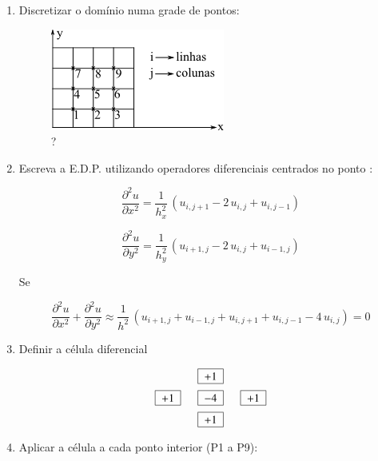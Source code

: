 \begin{enumerate}
 \item Discretizar o domínio numa grade de pontos:

\begin{figure}[htb]
 \centering
 \includegraphics[scale=1.0]{capitulos/capitulo3/figuras/aprox_der_par_dif_fin2.png}
 \caption{?}
 \label{fig:aprox_der_par_dif_fin2}
\end{figure}

\item Escreva a E.D.P. utilizando operadores diferenciais centrados no ponto :

\begin{equation}
 \label{cap3:sec4:eq1}
 \frac{\partial^2 u}{\partial x^2} = \frac{1}{h_x^2} \, (u_{i,j+1} - 2\,u_{i,j} + u_{i,j-1})
\end{equation}

\begin{equation}
 \label{cap3:sec4:eq2}
 \frac{\partial^2 u}{\partial y^2} = \frac{1}{h_y^2} \, (u_{i+1,j} - 2\,u_{i,j} + u_{i-1,j})
\end{equation}

Se 

\begin{equation}
 \label{cap3:sec4:eq3}
 \frac{\partial^2 u}{\partial x^2} + \frac{\partial^2 u}{\partial y^2} \approx \frac{1}{h^2} \, (u_{i+1,j} + u_{i-1,j} + u_{i,j+1} + u_{i,j-1} - 4\,u_{i,j}) = 0
\end{equation}

\item Definir a célula diferencial

\[
 \begin{array}{lll}
                   & \quadricular{+1} & \vspace*{0.2cm} \\
  \quadricular{+1} & \quadricular{-4} & \quadricular{+1} \vspace*{0.2cm} \\
                   & \quadricular{+1} &
 \end{array}
\]

\item Aplicar a célula a cada ponto interior (P1 a P9):


\end{enumerate}
